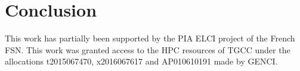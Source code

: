 \documentclass[smallextended]{svjour3}       %
\begin{document}
\section{Conclusion}
\label{sect:concl}

\begin{acknowledgements}
This work has partially been supported by the PIA ELCI project of the French FSN.
This  work  was  granted  access  to  the  HPC  resources  of TGCC under  the 
allocations t2015067470, x2016067617 and AP010610191 made by GENCI.
\end{acknowledgements}


\end{document}
